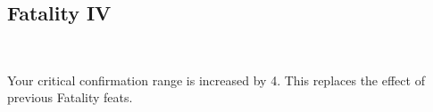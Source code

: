 \subsection*{Fatality IV}\label{feat:fatality4}
 \\

Your critical confirmation range is increased by 4. This replaces the effect
of previous Fatality feats.
